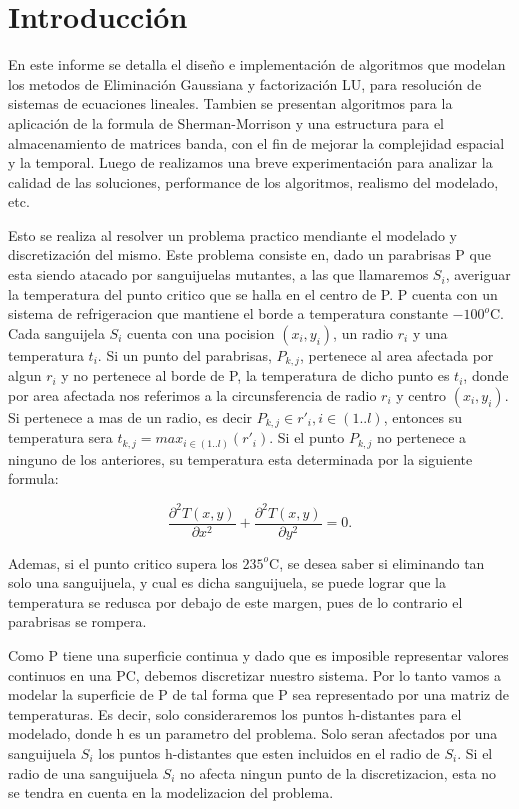 \section{Introducci\'on}

En este informe se detalla el dise\~no e implementaci\'on de algoritmos que modelan los metodos de Eliminaci\'on Gaussiana y factorizaci\'on LU,
para resoluci\'on de sistemas de ecuaciones lineales. Tambien se presentan algoritmos para la aplicaci\'on de la formula de Sherman-Morrison y
una estructura para el almacenamiento de matrices banda, con el fin de mejorar la complejidad espacial y la temporal. Luego de realizamos una %
breve experimentaci\'on para analizar la calidad de las soluciones, performance de los algoritmos, realismo del modelado, etc.

Esto se realiza al resolver un problema practico mendiante el modelado y discretizaci\'on del mismo. Este problema consiste en, dado un parabrisas 
P que esta siendo atacado por sanguijuelas mutantes, a las que llamaremos $S_i$, averiguar la temperatura del punto critico que se
halla en el centro de P. P cuenta con un sistema de refrigeracion que mantiene el borde a temperatura constante
$-100^o$C. Cada sanguijela $S_i$ cuenta con una pocision $(x_i, y_i)$, un radio $r_i$ y una temperatura $t_i$. Si un punto del
parabrisas, $P_{k,j}$, 
pertenece al area afectada por algun $r_i$ y no pertenece al borde de P, la temperatura de dicho punto es $t_i$, donde por area afectada nos referimos a la circunsferencia de 
radio $r_i $ y centro $(x_i, y_i)$. Si pertenece a mas de un radio, es decir
$P_{k,j} \in {r'_i}, i\in (1..l) $, entonces su temperatura sera 
$t_{k,j}=max_{i\in (1..l)}(r'_i) $. Si el punto $P_{k,j}$ no pertenece a ninguno de los anteriores,
su temperatura esta determinada por la siguiente formula:


\begin{equation}\label{eq:calor}
\frac{\partial^2T(x,y)}{\partial x^{2}}+\frac{\partial^2 T(x,y)}{\partial y^{2}} = 0.
\end{equation}

Ademas, si el punto critico supera los $235^o $C, se desea saber si eliminando tan solo una sanguijuela, y cual es dicha sanguijuela,
se puede lograr que la 
temperatura se redusca por debajo de este margen, pues de lo contrario el parabrisas se rompera.

Como P tiene una superficie continua y dado que es imposible representar valores continuos en una PC,
debemos discretizar nuestro sistema. Por lo tanto vamos a modelar la superficie de P de tal forma que P sea representado por una matriz de
temperaturas. Es decir, solo consideraremos los puntos h-distantes para el modelado, donde h es un parametro del problema. 
Solo seran afectados por una sanguijuela $S_i$ los puntos h-distantes que esten incluidos en el radio de $S_i$. Si el radio de una sanguijuela $S_i$ no 
afecta ningun punto de la discretizacion, esta no se tendra en cuenta en la modelizacion del problema. 

